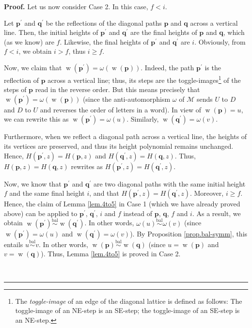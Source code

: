 \documentclass[numbers=enddot,12pt,final,onecolumn,notitlepage]{scrartcl}%
\theoremstyle{definition}
\newenvironment{proof}[1][Proof]{\noindent\textbf{#1.} }{\ \rule{0.5em}{0.5em}}
\newcommand{\M}{\mathcal{M}}
\newcommand{\pp}{\mathbf{p}}
\newcommand{\qq}{\mathbf{q}}
\newcommand{\w}{\operatorname{w}}
\newcommand{\balsim}{\overset{\operatorname*{bal}}{\sim}}
\newenvironment{verlong}{}{}
\begin{document}
\begin{verlong}
\begin{proof}
Let us now consider Case 2. In this case, $f<i$.

Let $\pp^{\prime}$ and $\qq^{\prime}$ be the reflections of the
diagonal paths $\pp$ and $\qq$ across a vertical line. Then, the
initial heights of $\pp^{\prime}$ and $\qq^{\prime}$ are the
final heights of $\pp$ and $\qq$, which (as we know) are $f$.
Likewise, the final heights of $\pp^{\prime}$ and $\qq^{\prime}$
are $i$. Obviously, from $f<i$, we obtain $i>f$, thus $i\geq f$.

Now, we claim that $\w\left(  \pp^{\prime}\right)
=\omega\left(  \w\left(  \pp\right)  \right)  $. Indeed,
the path $\pp^{\prime}$ is the reflection of $\pp$ across a
vertical line; thus, its steps are the toggle-images\footnote{The \emph{toggle-image} of
an edge of the diagonal lattice is defined as follows: The toggle-image of an
NE-step is an SE-step; the toggle-image of an SE-step is an NE-step.} of the steps
of $\pp$ read in the reverse order. But this means precisely that
$\w\left(  \pp^{\prime}\right)  =\omega\left(
\w\left(  \pp\right)  \right)  $ (since the
anti-automorphism $\omega$ of $\M$ sends $U$ to $D$ and $D$ to $U$
and reverses the order of letters in a word). In view of $\w%
\left(  \pp\right)  =u$, we can rewrite this as $\w%
\left(  \pp^{\prime}\right)  =\omega\left(  u\right)  $. Similarly,
$\w\left(  \qq^{\prime}\right)  =\omega\left(  v\right)
$.

Furthermore, when we reflect a diagonal path across a vertical line, the
heights of its vertices are preserved, and thus its height polynomial remains
unchanged. Hence, $H\left(  \pp^{\prime},z\right)  =H\left(
\pp,z\right)  $ and $H\left(  \qq^{\prime},z\right)  =H\left(
\qq,z\right)  $. Thus, $H\left(  \pp,z\right)  =H\left(
\qq,z\right)  $ rewrites as $H\left(  \pp^{\prime},z\right)
=H\left(  \qq^{\prime},z\right)  $.

Now, we know that $\pp^{\prime}$ and $\qq^{\prime}$ are two
diagonal paths with the same initial height $f$ and the same final height $i$,
and that $H\left(  \pp^{\prime},z\right)  =H\left(  \qq^{\prime
},z\right)  $. Moreover, $i\geq f$. Hence, the claim of Lemma \ref{lem.4to5}
in Case 1 (which we have already proved above) can be applied to
$\pp^{\prime}$, $\qq^{\prime}$, $i$ and $f$ instead of
$\pp$, $\qq$, $f$ and $i$. As a result, we obtain
$\w\left(  \pp^{\prime}\right)
\balsim \w\left(  \qq%
^{\prime}\right)  $. In other words, $\omega\left(  u\right)
\balsim \omega\left(  v\right)  $ (since
$\w\left(  \pp^{\prime}\right)  =\omega\left(  u\right)
$ and $\w\left(  \qq^{\prime}\right)  =\omega\left(
v\right)  $). By Proposition \ref{prop.bal-symm}, this entails
$u \balsim v$. In other words, $\w%
\left(  \pp\right)  \balsim
\w\left(  \qq\right)  $ (since $u=\w%
\left(  \pp\right)  $ and $v=\w\left(  \qq%
\right)  $). Thus, Lemma \ref{lem.4to5} is proved in Case 2.


\end{proof}
\end{verlong}
\end{document}
